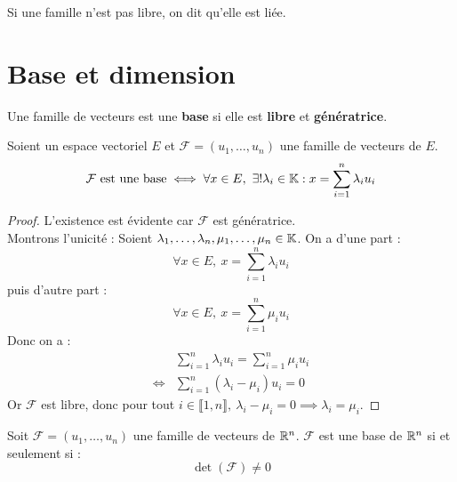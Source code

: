 \begin{remark}
	Si une famille n'est pas libre, on dit qu'elle est liée.
\end{remark}

\section{Base et dimension}
\begin{definition}[Base]
	Une famille de vecteurs est une \textbf{base} si elle est \textbf{libre} et \textbf{génératrice}.
\end{definition}

\begin{proposition}
	Soient un espace vectoriel $E$ et $\mathcal{F} = (u_1, \ldots, u_n)$ une famille de vecteurs de $E$.
	\[ 
	\mathcal{F} \text{ est une base} \iff 
	\forall x \in E,\ \exists ! \lambda_i \in \mathbb{K} : x = \sum_{i = 1}^n \lambda_i u_i
	\]
\end{proposition}

\begin{proof}
	L'existence est évidente car $\mathcal{F}$ est génératrice. 
	\\
	Montrons l'unicité : Soient $\lambda_1, \ldots, \lambda_n, \mu_1, \ldots, \mu_n \in \mathbb{K}$.
	On a d'une part :
	\[ \forall x \in E,\ x = \sum_{i=1}^{n} \lambda_i u_i \]
	puis d'autre part :
	\[ \forall x \in E,\ x = \sum_{i=1}^{n} \mu_i u_i \]
	Donc on a :
	\begin{align*}
		&\sum_{i=1}^{n} \lambda_i u_i = \sum_{i=1}^{n} \mu_i u_i \\
		\iff &\sum_{i=1}^{n} (\lambda_i - \mu_i) u_i = 0 
	\end{align*}
	Or $\mathcal{F}$ est libre, donc pour tout $i \in \llbracket 1, n \rrbracket,\ \lambda_i - \mu_i = 0 \implies \lambda_i = \mu_i$.
\end{proof}

\begin{proposition}
	Soit $\mathcal{F} = (u_1, \ldots, u_n)$ une famille de vecteurs de $\mathbb{R}^n$. $\mathcal{F}$ est une base de $\mathbb{R}^n$ si et seulement si :
	\[ \det(\mathcal{F}) \neq 0 \]
\end{proposition}


